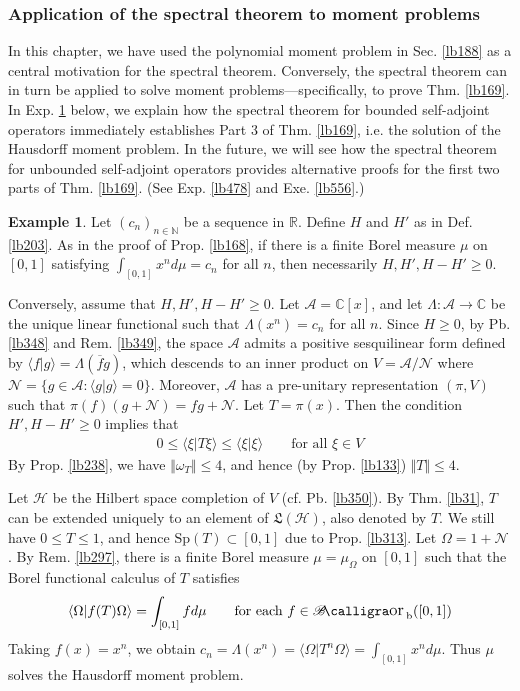 \documentclass[12pt,b5paper,notitlepage]{article}
\theoremstyle{definition}
\newtheorem{eg}[df]{Example}
\theoremstyle{plain}
\DeclareMathOperator{\Borb}{{\mathscr{B}\text{\kern -2pt {\calligra\large or}}\,}_{\mathrm b}}
\newcommand{\fk}{\mathfrak}
\newcommand{\ovl}{\overline}
\newcommand{\bk}[1]{\langle {#1}\rangle}
\newcommand{\scr}{\mathscr}
\newcommand{\Cbb}{\mathbb C}
\newcommand{\Nbb}{\mathbb N}
\newcommand{\Rbb}{\mathbb R}
\newcommand{\Sp}{\mathrm{Sp}}
\newcommand{\MH}{\mathcal H}
\newcommand{\SA}{\mathscr A}
\newcommand{\hqed}{\hfill\qedsymbol}
\numberwithin{equation}{section}
\begin{document}
\subsubsection{Application of the spectral theorem to moment problems}


In this chapter, we have used the polynomial moment problem in Sec. \ref{lb188} as a central motivation for the spectral theorem. Conversely, the spectral theorem can in turn be applied to solve moment problems---specifically, to prove Thm. \ref{lb169}. In Exp. \ref{lb351} below, we explain how the spectral theorem for bounded self-adjoint operators immediately establishes Part 3 of Thm. \ref{lb169}, i.e. the solution of the Hausdorff moment problem. In the future, we will see how the spectral theorem for unbounded self-adjoint operators provides alternative proofs for the first two parts of Thm. \ref{lb169}. (See Exp. \ref{lb478} and Exe. \ref{lb556}.)





\begin{eg}\label{lb351}
Let $(c_n)_{n\in\Nbb}$ be a sequence in $\Rbb$. Define $H$ and $H'$ as in Def. \ref{lb203}. As in the proof of Prop. \ref{lb168}, if there is a finite Borel measure $\mu$ on $[0,1]$ satisfying $\int_{[0,1]}x^nd\mu=c_n$ for all $n$, then necessarily $H,H',H-H'\geq0$.

Conversely, assume that $H,H',H-H'\geq0$. Let $\SA=\Cbb[x]$, and let $\Lambda:\SA\rightarrow\Cbb$ be the unique linear functional such that $\Lambda(x^n)=c_n$ for all $n$. Since $H\geq0$, by Pb. \ref{lb348} and Rem. \ref{lb349}, the space $\SA$ admits a positive sesquilinear form defined by $\bk{f|g}=\Lambda(\ovl fg)$, which descends to an inner product on $V=\SA/\scr N$ where $\scr N=\{g\in\SA:\bk{g|g}=0\}$. Moreover, $\SA$ has a pre-unitary representation $(\pi,V)$ such that $\pi(f)(g+\scr N)=fg+\scr N$. Let $T=\pi(x)$. Then the condition $H',H-H'\geq0$ implies that 
\begin{align*}
0\leq\bk{\xi|T\xi}\leq \bk{\xi|\xi}\qquad\text{for all }\xi\in V
\end{align*}
By Prop. \ref{lb238}, we have $\Vert\omega_T\Vert\leq 4$, and hence (by Prop. \ref{lb133}) $\Vert T\Vert\leq 4$.

Let $\MH$ be the Hilbert space completion of $V$ (cf. Pb. \ref{lb350}). By Thm. \ref{lb31}, $T$ can be extended uniquely to an element of $\fk L(\MH)$, also denoted by $T$. We still have $0\leq T\leq 1$, and hence $\Sp(T)\subset[0,1]$ due to Prop. \ref{lb313}. Let $\Omega=1+\scr N$. By Rem. \ref{lb297}, there is a finite Borel measure $\mu=\mu_\Omega$ on $[0,1]$ such that the Borel functional calculus of $T$ satisfies
\begin{align*}
\bk{\Omega|f(T)\Omega}=\int_{[0,1]}fd\mu\qquad\text{for each }f\in\Borb([0,1])
\end{align*}
Taking $f(x)=x^n$, we obtain $c_n=\Lambda(x^n)=\bk{\Omega|T^n\Omega}=\int_{[0,1]}x^nd\mu$. Thus $\mu$ solves the Hausdorff moment problem.   \hqed
\end{eg}
\end{document}

